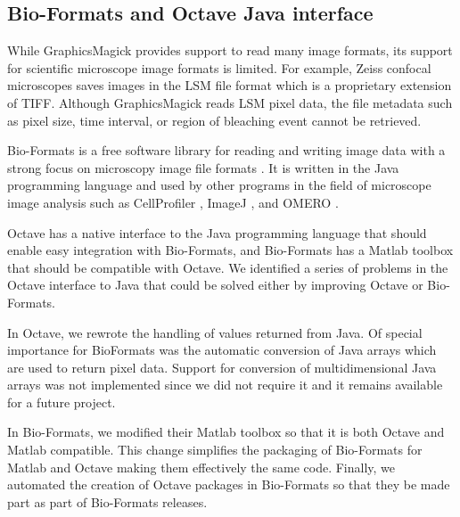 \subsection{Bio-Formats and Octave Java interface}

While GraphicsMagick provides support to read many image formats, its
support for scientific microscope image formats is limited.
For example, Zeiss confocal microscopes saves
images in the LSM file format which is a proprietary extension of TIFF.
Although GraphicsMagick reads LSM pixel data,
the file metadata such as pixel size, time interval, or region of
bleaching event cannot be retrieved.

Bio-Formats is a free software library for reading and writing image
data with a strong focus on microscopy image file formats
\citep{bioformats}.  It is written in the Java programming language and
used by other programs in the field of microscope image analysis such
as CellProfiler \citep{cellprofiler}, ImageJ \citep{imagej2}, and OMERO
\citep{omero}.

Octave has a native interface to the Java programming language
that should enable easy integration with
Bio-Formats, and Bio-Formats has a Matlab toolbox that should be
compatible with Octave.
We identified a series of problems in the Octave interface to Java that
could be solved either by improving Octave or Bio-Formats.

In Octave, we rewrote the handling of values returned from Java.
Of special importance for BioFormats was the automatic conversion of
Java arrays which are used to return pixel data.
Support for conversion of multidimensional Java arrays was not implemented
since we did not require it and it remains available for a future project.

In Bio-Formats, we modified their Matlab toolbox so that it is
both Octave and Matlab compatible.
This change simplifies the packaging of
Bio-Formats for Matlab and Octave making them
effectively the same code.
Finally, we automated the creation of Octave packages in Bio-Formats
so that they be made part as part of Bio-Formats releases.

